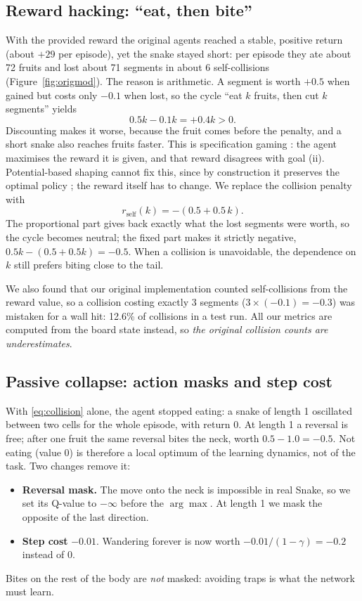 \documentclass{article}
\begin{document}
\subsection{Reward hacking: ``eat, then bite''}
\label{sec:hacking}
With the provided reward the original agents reached a stable, positive return (about $+29$ per episode), yet the snake stayed short: per episode they ate about 72 fruits and lost about 71 segments in about 6 self-collisions (Figure~\ref{fig:origmod}).
The reason is arithmetic. A segment is worth $+0.5$ when gained but costs only $-0.1$ when lost, so the cycle ``eat $k$ fruits, then cut $k$ segments'' yields
\begin{equation}
0.5k - 0.1k = +0.4k > 0 .
\end{equation}
Discounting makes it worse, because the fruit comes before the penalty, and a short snake also reaches fruits faster.
This is specification gaming \cite{amodei2016,krakovna2020}: the agent maximises the reward it is given, and that reward disagrees with goal (ii).
Potential-based shaping cannot fix this, since by construction it preserves the optimal policy \cite{ng1999}; the reward itself has to change.
We replace the collision penalty with
\begin{equation}
r_{\text{self}}(k) = -(0.5 + 0.5\,k).
\label{eq:collision}
\end{equation}
The proportional part gives back exactly what the lost segments were worth, so the cycle becomes neutral; the fixed part makes it strictly negative, $0.5k-(0.5+0.5k)=-0.5$.
When a collision is unavoidable, the dependence on $k$ still prefers biting close to the tail.

We also found that our original implementation counted self-collisions from the reward value, so a collision costing exactly 3 segments ($3\times(-0.1)=-0.3$) was mistaken for a wall hit: 12.6\% of collisions in a test run.
All our metrics are computed from the board state instead, so \emph{the original collision counts are underestimates}.

\subsection{Passive collapse: action masks and step cost}
\label{sec:collapse}
With \eqref{eq:collision} alone, the agent stopped eating: a snake of length 1 oscillated between two cells for the whole episode, with return 0.
At length 1 a reversal is free; after one fruit the same reversal bites the neck, worth $0.5-1.0=-0.5$. Not eating (value 0) is therefore a local optimum of the learning dynamics, not of the task.
Two changes remove it:
\begin{itemize}
\item \textbf{Reversal mask.} The move onto the neck is impossible in real Snake, so we set its Q-value to $-\infty$ before the $\arg\max$. At length 1 we mask the opposite of the last direction.
\item \textbf{Step cost} $-0.01$. Wandering forever is now worth $-0.01/(1-\gamma)=-0.2$ instead of 0.
\end{itemize}
Bites on the rest of the body are \emph{not} masked: avoiding traps is what the network must learn.
\end{document}
